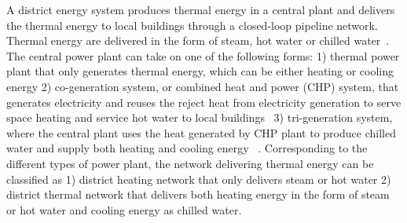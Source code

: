 A district energy system produces thermal energy in a central plant
and delivers the thermal energy to local buildings through a
closed-loop pipeline network. Thermal energy are delivered in the form
of steam, hot water or chilled water~\cite{baird2014}. The central
power plant can take on one of the following forms: 1) thermal power
plant that only generates thermal energy, which can be either heating
or cooling energy 2) co-generation system, or combined heat and power
(CHP) system, that generates electricity and reuses the reject heat
from electricity generation to serve space heating and service hot
water to local buildings~\cite{IDEA2005} 3) tri-generation system,
where the central plant uses the heat generated by CHP plant to
produce chilled water and supply both heating and cooling energy
~\cite{cchp2015}. Corresponding to the different types of power plant,
the network delivering thermal energy can be classified as 1) district
heating network that only delivers steam or hot water 2) district
thermal network that delivers both heating energy in the form of steam
or hot water and cooling energy as chilled water.

